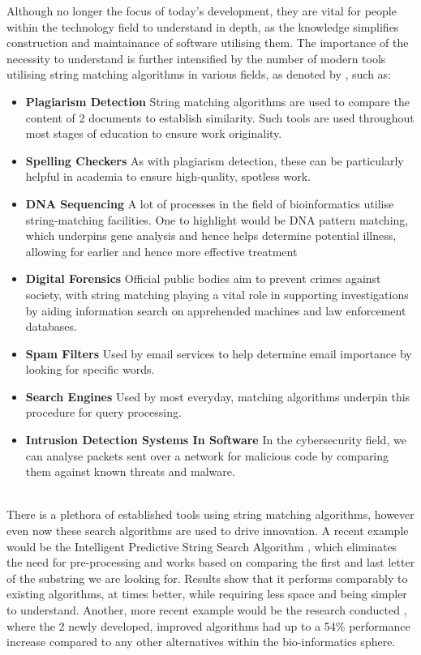\documentclass{l4proj}
\begin{document}
Although no longer the focus of today's development, they are vital for people within the technology field to understand in depth, as the knowledge simplifies construction and maintainance of software utilising them. The importance of the necessity to understand is further intensified by the number of modern tools utilising string matching algorithms in various fields, as denoted by \citet{GeeksforGeeks_2022}, such as:
\begin{itemize}
  \item \textbf{Plagiarism Detection} String matching algorithms are used to compare the content of 2 documents to establish similarity. Such tools are used throughout most stages of education to ensure work originality.
\item \textbf{Spelling Checkers} As with plagiarism detection, these can be particularly helpful in academia to ensure high-quality, spotless work.
  \item \textbf{DNA Sequencing} A lot of processes in the field of bioinformatics utilise string-matching facilities. One to highlight would be DNA pattern matching, which underpins gene analysis and hence helps determine potential illness, allowing for earlier and hence more effective treatment
  \item \textbf{Digital Forensics} Official public bodies aim to prevent crimes against society, with string matching playing a vital role in supporting investigations by aiding information search on apprehended machines and law enforcement databases.
  \item \textbf{Spam Filters} Used by email services to help determine email importance by looking for specific words.
  \item \textbf{Search Engines} Used by most everyday, matching algorithms underpin this procedure for query processing.
  \item \textbf{Intrusion Detection Systems In Software} In the cybersecurity field, we can analyse packets sent over a network for malicious code by comparing them against known threats and malware.
\end{itemize}

\\


There is a plethora of established tools using string matching algorithms, however even now these search algorithms are used to drive innovation. A recent example would be the Intelligent Predictive String Search Algorithm \cite{GURUNG2016161}, which eliminates the need for pre-processing and works based on comparing the first and last letter of the substring we are looking for. Results show that it performs comparably to existing algorithms, at times better, while requiring less space and being simpler to understand. Another, more recent example would be the research conducted \cite{Ibrahim2023}, where the 2 newly developed, improved algorithms had up to a 54\% performance increase compared to any other alternatives within the bio-informatics sphere.
\end{document}
